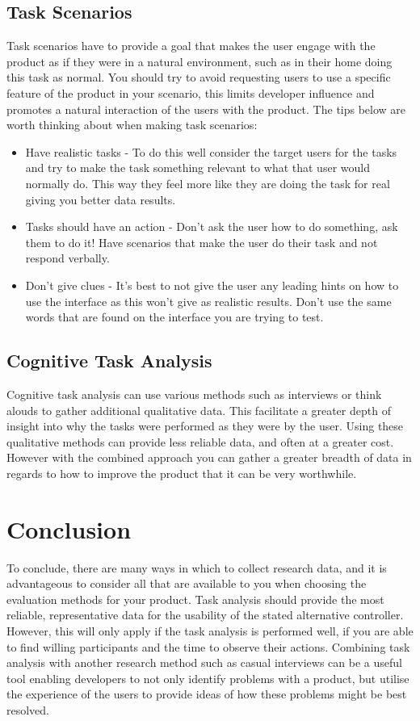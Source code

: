 \documentclass{scrartcl}
\begin{document}
	\subsection{Task Scenarios}
		Task scenarios have to provide a goal that makes the user engage with the product as if they were in a natural environment, such as in their home doing this task as normal. You should try to avoid requesting users to use a specific feature of the product in your scenario, this limits developer influence and promotes a natural interaction of the users with the product. The tips below are worth thinking about when making task scenarios:\cite{nielsen_norman_tognazzini_2018}
		\begin{itemize}
			\item Have realistic tasks - To do this well consider the target users for the tasks and try to make the task something relevant to what that user would normally do. This way they feel more like they are doing the task for real giving you better data results.
			\item Tasks should have an action - Don't ask the user how to do something, ask them to do it! Have scenarios that make the user do their task and not respond verbally.
			\item Don't give clues - It's best to not give the user any leading hints on how to use the interface as this won't give as realistic results. Don't use the same words that are found on the interface you are trying to test.
		\end{itemize}	
		
		
	\subsection{Cognitive Task Analysis}
	Cognitive task analysis can use various methods such as interviews or think alouds to gather additional qualitative data. This facilitate a greater depth of insight into why the tasks were performed as they were by the user\cite{clark2007cognitive}. Using these qualitative methods can provide less reliable data, and often at a greater cost. However with the combined approach you can gather a greater breadth of data in regards to how to improve the product that it can be very worthwhile\cite{koedinger2016closing}. 
	


	\section{Conclusion}
	To conclude, there are many ways in which to collect research data, and it is advantageous to consider all that are available to you when choosing the evaluation methods for your product. Task analysis should provide the most reliable, representative data for the usability of the stated alternative controller. However, this will only apply if the task analysis is performed well, if you are able to find willing participants and the time to observe their actions. Combining task analysis with another research method such as casual interviews can be a useful tool enabling developers to not only identify problems with a product, but utilise the experience of the users to provide ideas of how these problems might be best resolved. 

	
	
	
	
\end{document}
